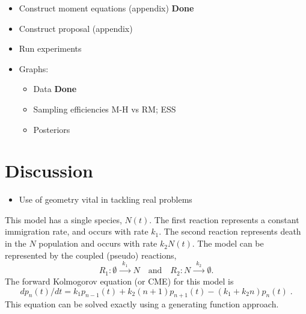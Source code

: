 \documentclass{pnastwo}
\begin{document}
\begin{article}
    \begin{itemize}
    \item Construct moment equations (appendix) \textbf{Done}
    \item Construct proposal (appendix)
    \item Run experiments
    \item Graphs:
      \begin{itemize}
      \item Data \textbf{Done}
      \item Sampling efficiencies M-H vs RM; ESS
      \item Posteriors
      \end{itemize}
    \end{itemize}
    
\section{Discussion}

\begin{itemize}
\item Use of geometry vital in tackling real problems
\end{itemize}







This model has a single species, $N(t)$. The first reaction represents a constant immigration rate, and occurs with rate $k_1$. The second reaction represents death in the $N$ population and occurs with rate $k_2 N(t)$. The model can be represented by the coupled (pseudo) reactions, 
\begin{equation}\label{1}
R_1: \emptyset  \xrightarrow{\phantom{a}k_1\phantom{a}} N 
\quad \text{and} \quad
R_2: N  \xrightarrow{\phantom{a}k_2\phantom{a}} \emptyset.
\end{equation}
The forward Kolmogorov equation (or CME) for this model is
\[
dp_{n}(t)/dt = k_1 p_{n-1}(t) +  k_2 (n+1) p_{n+1}(t) 
- (k_1 + k_2 n) p_{n}(t) \;.
\]
This equation can be solved exactly using a generating function approach.


\end{article}
\end{document}
